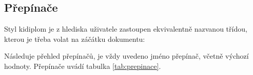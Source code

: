 \documentclass[
  biblatex,
  figures=false,
  glossaries,
  index
]{kidiplom}
\begin{document}
\subsection{Přepínače}
Styl kidiplom je z hlediska uživatele zastoupen ekvivalentně nazvanou třídou, kterou je třeba volat na záčátku dokumentu:

Následuje přehled přepínačů, je vždy uvedeno jméno přepínač, včetně výchozí hodnoty. Přepínače uvádí tabulka \ref{tab:prepinace}.
\end{document}
